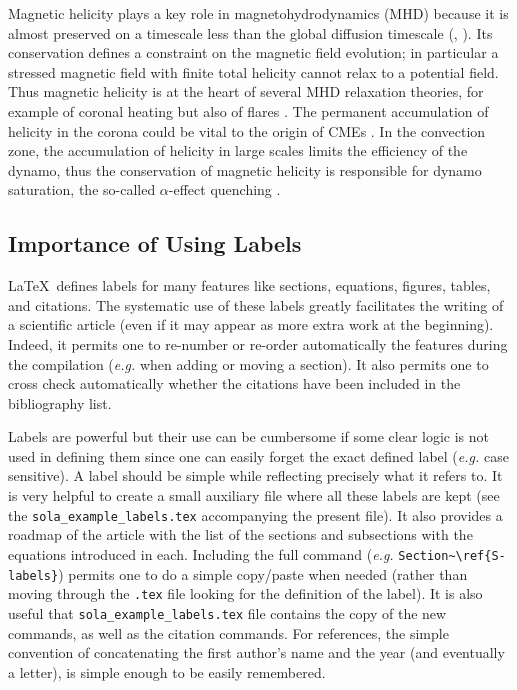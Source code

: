 \documentclass[namedreferences]{solarphysics}
\begin{document}
\begin{article}
Magnetic helicity plays a key role in magnetohydrodynamics (MHD)
because it is almost preserved on a timescale less than the global
diffusion timescale (\citealp{Berger84}, \citeyear{Berger03}).  
Its conservation defines a
constraint on the magnetic field evolution; in particular a
stressed magnetic field with finite total helicity cannot relax to
a potential field.  Thus magnetic helicity is at the heart of
several MHD relaxation theories, for example of coronal heating
\citep{Heyvaerts84} but also of flares \citep{Kusano04,Melrose04}.
The permanent accumulation of helicity in the corona could be
vital to the origin of CMEs \citep{Rust94,Low97}.  In the
convection zone, the accumulation of helicity in large scales
limits the efficiency of the dynamo, thus the conservation of
magnetic helicity is responsible for dynamo saturation, the
so-called $\alpha$-effect quenching \citep{Brandenburg01}.

\subsection{Importance of Using Labels} %
  \label{S-labels}

    \LaTeX\ defines labels for many features like sections, 
equations, figures, tables, and citations.  The systematic use
of these labels greatly facilitates the writing of a scientific
article (even if it may appear as more extra work at the beginning).
Indeed, it permits one to re-number or re-order automatically the
features during the compilation ({\it e.g.} when adding or moving a 
section).  It also permits one to
cross check automatically whether the citations have been included
in the bibliography list.

    Labels are powerful but their use can be cumbersome if some
clear logic is not used in defining them since one can easily
forget the exact defined label ({\it e.g.} case sensitive).
A label should be simple
while reflecting precisely what it refers to. It is very helpful
to create a small auxiliary file where all these labels are
kept (see the \verb+sola_example_labels.tex+ 
accompanying the present file).   
It also provides a roadmap of the article with the list
of the sections and subsections with the equations introduced in each.     
Including the full command ({\it e.g.} \verb+Section~\ref{S-labels}+)
permits one to do a simple copy/paste when needed (rather than moving
through the \texttt{.tex} file looking for the definition of the label). 
It is also useful that  
\verb+sola_example_labels.tex+   file contains the copy of the 
new commands, as well as the citation commands. For references,
the simple convention of concatenating the first author's name and the year
(and eventually a letter), is simple enough to be easily remembered.
    

\end{article}
\end{document}
